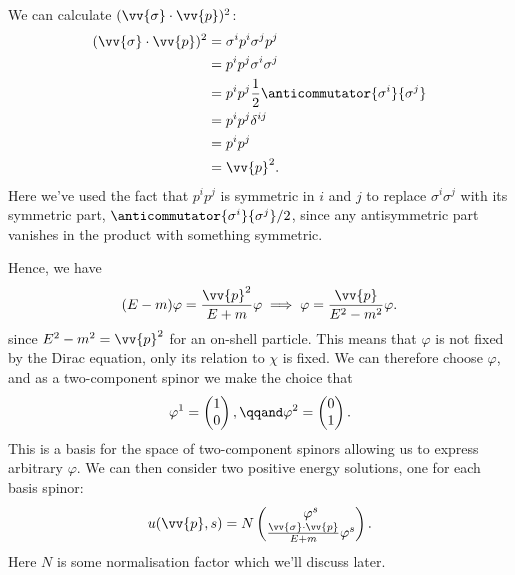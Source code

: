 \documentclass[fleqn]{NotesClass}
\begin{document}
    We can calculate \((\vv{\sigma} \cdot \vv{p})^2\):
    \begin{align}
        (\vv{\sigma} \cdot \vv{p})^2 &= \sigma^i p^i \sigma^j p^j\\
        &= p^ip^j \sigma^i\sigma^j\\
        &= p^ip^j \frac{1}{2}\anticommutator{\sigma^i}{\sigma^j}\\
        &= p^ip^j \delta^{ij}\\
        &= p^ip^j\\
        &= \vv{p}^2.
    \end{align}
    Here we've used the fact that \(p^ip^j\) is symmetric in \(i\) and \(j\) to replace \(\sigma^i\sigma^j\) with its symmetric part, \(\anticommutator{\sigma^i}{\sigma^j}/2\), since any antisymmetric part vanishes in the product with something symmetric.
    
    Hence, we have
    \begin{equation}
        (E - m)\varphi = \frac{\vv{p}^2}{E + m}\varphi \implies \varphi = \frac{\vv{p}}{E^2 - m^2}\varphi.
    \end{equation}
    since \(E^2 - m^2 = \vv{p}^2\) for an on-shell particle.
    This means that \(\varphi\) is not fixed by the Dirac equation, only its relation to \(\chi\) is fixed.
    We can therefore choose \(\varphi\), and as a two-component spinor we make the choice that
    \begin{equation}
        \varphi^1 = 
        \begin{pmatrix}
            1\\ 0
        \end{pmatrix}
        , \qqand \varphi^2 = 
        \begin{pmatrix}
            0\\ 1
        \end{pmatrix}
        .
    \end{equation}
    This is a basis for the space of two-component spinors allowing us to express arbitrary \(\varphi\).
    We can then consider two positive energy solutions, one for each basis spinor:
    \begin{equation}
        u(\vv{p}, s) = N
        \begin{pmatrix}
            \varphi^s\\
            \frac{\vv{\sigma} \cdot \vv{p}}{E + m}\varphi^s
        \end{pmatrix}
        .
    \end{equation}
    Here \(N\) is some normalisation factor which we'll discuss later.
    
\end{document}
